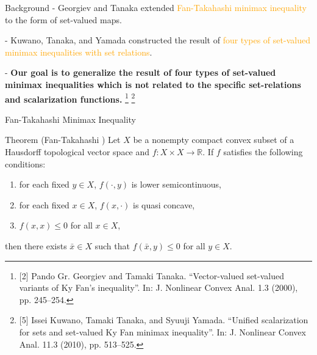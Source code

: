 \documentclass[aspectratio=169, dvipdfmx, 11pt]{beamer}
\newcommand{\RealNumberSet}{\mathbb{R}}
\begin{document}
\begin{frame}{Background}
  - Georgiev and Tanaka \cite{MR1807037} extended \textcolor{orange}{Fan-Takahashi minimax inequality} to the form of set-valued maps.

  - Kuwano, Tanaka, and Yamada \cite{MR2778674} constructed the result of \textcolor{orange}{four types of set-valued minimax inequalities
  with set relations}.

  - \textbf{Our goal is to generalize the result of four types of set-valued minimax inequalities which is not related to the specific set-relations and scalarization functions.}
  \renewcommand{\thefootnote}{\fnsymbol{footnote}}%
  \footnote[0]{[2] Pando Gr. Georgiev and Tamaki Tanaka. “Vector-valued set-valued variants of
    Ky Fan's inequality”. In: J. Nonlinear Convex Anal. 1.3 (2000), pp. 245--254.}
  \footnote[0]{[5] Issei Kuwano, Tamaki Tanaka, and Syuuji Yamada. “Uniﬁed scalarization for
    sets and set-valued Ky Fan minimax inequality”. In: J. Nonlinear Convex Anal.
    11.3 (2010), pp. 513--525.}
\end{frame}

\begin{frame}{Fan-Takahashi Minimax Inequality}
  \begin{block}{Theorem (Fan-Takahashi \cite{MR399979})} %
    Let $X$ be a nonempty compact convex subset of a Hausdorff topological vector space and $f \colon X \times X \to \RealNumberSet$. If $f$ satisfies
    the following conditions:
    \begin{enumerate}
      \item for each fixed $y \in X$, $f(\cdot,y)$ is lower semicontinuous,
      \item for each fixed $x \in X$, $f(x,\cdot)$ is quasi concave,
      \item $f(x,x) \leq 0$ for all $x \in X$,
    \end{enumerate}
    then there exists $\bar{x} \in X$ such that $f(\bar{x},y) \leq 0$ for all $y \in X$.
  \end{block}
\end{frame}
\end{document}
